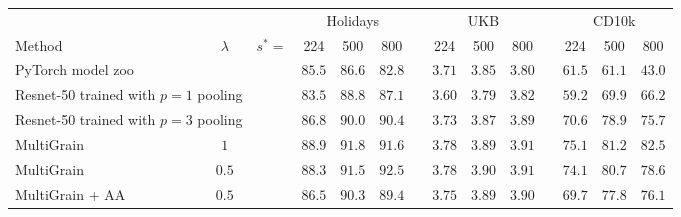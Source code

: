 %
\def \mysp {\hspace{5pt}}
{\small
%
\begin{tabular}{lc c c@{\mysp}c@{\mysp}c c c@{\mysp}c@{\mysp}c c c@{\mysp}c@{\mysp}c}
\toprule
& & & \multicolumn{3}{c}{Holidays} & &  \multicolumn{3}{c}{UKB} & & \multicolumn{3}{c}{CD10k} \\
\cmidrule(rl){4-6} \cmidrule(rl){8-10} \cmidrule(rl){12-14}
Method & $\lambda$ & $s^*=$ & 224 & 500 & 800 &  & 224 & 500 & 800 &  & 224 & 500 & 800 \\
\midrule
\multicolumn{2}{l}{PyTorch model zoo} & & $85.5$ & $86.6$ & $82.8$ &      & $3.71$ & $3.85$ & $3.80$ &    & $61.5$ & $61.1$ & $43.0$\\
\multicolumn{2}{l}{Resnet-50 trained with $p = 1$ pooling} & & $83.5$ & $88.8$ & $87.1$ &    & $3.60$ & $3.79$ & $3.82$ &    & $59.2$ & $69.9$ & $66.2$\\
\multicolumn{2}{l}{Resnet-50 trained with $p = 3$ pooling} & & $86.8$ & $90.0$ & $90.4$ &    & $3.73$ & $3.87$ & $3.89$ &    & $70.6$ & $78.9$ & $75.7$ \\
MultiGrain & $1$ & & $\bm{88.9}$ & $\bm{91.8}$ & $91.6$ &  & $\bm{3.78}$ & $3.89$ & $\bm{3.91}$ & & $\bm{75.1}$ & $\bm{81.2}$ & $\bm{82.5}$ \\
MultiGrain & $0.5$ & & $88.3$ & $91.5$ & $\bm{92.5}$ & & $\bm{3.78}$ & $\bm{3.90}$ & $\bm{3.91}$ & & $74.1$ & $80.7$ & $78.6$  \\
MultiGrain + AA & $0.5$ & & $86.5$ & $90.3$ & $89.4$ & & $3.75$ & $3.89$ & $3.90$ & & $69.7$ & $77.8$ & $76.1$  \\
\bottomrule
\end{tabular}

%
%
%
%
%
%
%
%
%
%
%
%
%
%
%
%
%
%
%
%
%
%
%
%
%




%
%
%
%
%
%
%
%
%
%
%
%
%
%
%
%
%
%
%
%
%



%
%
%
%
%
%
%
%
%
%
%
%
%
%
%
%
%
%
%
%
%
%
%
%
%
%
%
%
%
%
%
%
%
%
%
%
%
%
%
%

%
%
%
%
%
%
%
%
%
%
%
%
%
%
%
%
%
%

}